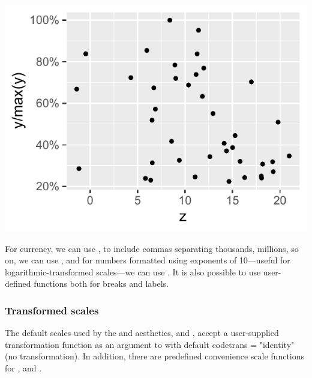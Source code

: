 \documentclass[krantz2]{krantz}\usepackage{knitr}
\begin{document}
\begin{knitrout}\footnotesize
{}\color{fgcolor}\begin{kframe}
\begin{alltt}
  \hlopt{/}  \hlopt{+}
  \hlstd{()} \hlopt{+}
  \hlstd{(} \hlopt{::}
\end{alltt}
\end{kframe}

{\centering \includegraphics[width=.54\textwidth]{figure/pos-scale-ticks-03-1}

}



\end{knitrout}

For currency, we can use , to include commas separating thousands, millions, so on, we can use , and for numbers formatted using exponents of 10---useful for logarithmic-transformed scales---we can use . It is also possible to use user-defined functions both for breaks and labels.

\subsubsection{Transformed scales}\label{sec:plot:scales:trans}

The default scales used by the  and  aesthetics,  and , accept a user-supplied transformation function as an argument to  with default code{trans = "identity"} (no transformation). In addition, there are predefined convenience scale functions for ,  and .
\end{document}
